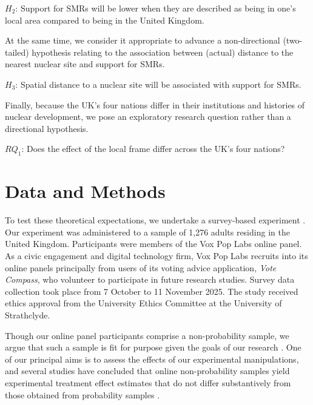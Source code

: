 \documentclass[a4paper, 11pt]{article}
\begin{document}
$H_2$: Support for SMRs will be lower when they are described as being in one's local area compared to being in the United Kingdom.

At the same time, we consider it appropriate to advance a non-directional (two-tailed) hypothesis relating to the association between (actual) distance to the nearest nuclear site and support for SMRs.

$H_3$: Spatial distance to a nuclear site will be associated with support for SMRs.

Finally, because the UK's four nations differ in their institutions and histories of nuclear development, we pose an exploratory research question rather than a directional hypothesis.

$\mathit{RQ}_1$: Does the effect of the local frame differ across the UK's four nations?

\section*{Data and Methods}

To test these theoretical expectations, we undertake a survey-based experiment \citep{druckman2022,mutz2011}. Our experiment was administered to a sample of 1,276 adults residing in the United Kingdom. Participants were members of the Vox Pop Labs online panel. As a civic engagement and digital technology firm, Vox Pop Labs recruits into its online panels principally from users of its voting advice application, \emph{Vote Compass}, who volunteer to participate in future research studies. Survey data collection took place from 7 October to 11 November 2025. The study received ethics approval from the University Ethics Committee at the University of Strathclyde.

Though our online panel participants comprise a non-probability sample, we argue that such a sample is fit for purpose given the goals of our research \citep[cf.][]{baker2013}. One of our principal aims is to assess the effects of our experimental manipulations, and several studies have concluded that online non-probability samples yield experimental treatment effect estimates that do not differ substantively from those obtained from probability samples \citep{coppock2018,krupnikov2014,mullinix2015}.
\end{document}

